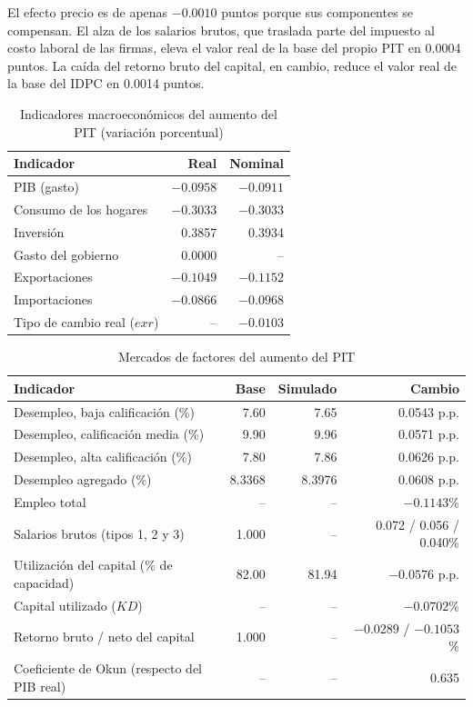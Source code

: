 \documentclass[11pt]{article}
\begin{document}
El efecto precio es de apenas $-0.0010$ puntos porque sus componentes se compensan. El alza de los salarios brutos, que traslada parte del impuesto al costo laboral de las firmas, eleva el valor real de la base del propio PIT en 0.0004 puntos. La caída del retorno bruto del capital, en cambio, reduce el valor real de la base del IDPC en 0.0014 puntos.

\begin{table}[H]
\centering
\caption{Indicadores macroeconómicos del aumento del PIT (variación porcentual)}
\begin{tabular}{|l|r|r|}
  \hline
  Indicador & Real & Nominal \\
  \hline
  PIB (gasto) & $-0.0958$ & $-0.0911$ \\
  \hline
  Consumo de los hogares & $-0.3033$ & $-0.3033$ \\
  \hline
  Inversión & 0.3857 & 0.3934 \\
  \hline
  Gasto del gobierno & 0.0000 & -- \\
  \hline
  Exportaciones & $-0.1049$ & $-0.1152$ \\
  \hline
  Importaciones & $-0.0866$ & $-0.0968$ \\
  \hline
  Tipo de cambio real ($exr$) & -- & $-0.0103$ \\
  \hline
\end{tabular}
\end{table}

\begin{table}[H]
\centering
\caption{Mercados de factores del aumento del PIT}
\small
\begin{tabular}{|l|r|r|r|}
  \hline
  Indicador & Base & Simulado & Cambio \\
  \hline
  Desempleo, baja calificación (\%) & 7.60 & 7.65 & 0.0543 p.p. \\
  \hline
  Desempleo, calificación media (\%) & 9.90 & 9.96 & 0.0571 p.p. \\
  \hline
  Desempleo, alta calificación (\%) & 7.80 & 7.86 & 0.0626 p.p. \\
  \hline
  Desempleo agregado (\%) & 8.3368 & 8.3976 & 0.0608 p.p. \\
  \hline
  Empleo total & -- & -- & $-0.1143$\% \\
  \hline
  Salarios brutos (tipos 1, 2 y 3) & 1.000 & -- & 0.072 / 0.056 / 0.040\% \\
  \hline
  Utilización del capital (\% de capacidad) & 82.00 & 81.94 & $-0.0576$ p.p. \\
  \hline
  Capital utilizado ($KD$) & -- & -- & $-0.0702$\% \\
  \hline
  Retorno bruto / neto del capital & 1.000 & -- & $-0.0289$ / $-0.1053$\% \\
  \hline
  Coeficiente de Okun (respecto del PIB real) & -- & -- & 0.635 \\
  \hline
\end{tabular}
\end{table}
\end{document}
